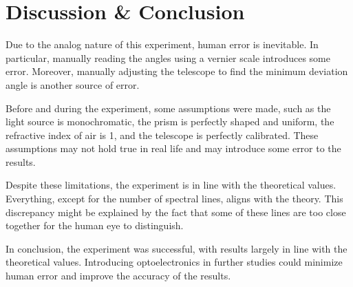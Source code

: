 \documentclass[10pt]{article}
\begin{document}
\section{Discussion \& Conclusion}


Due to the analog nature of this experiment, human error is inevitable. In particular, manually reading the angles using a vernier scale introduces some error. Moreover, manually adjusting the telescope to find the minimum deviation angle is another source of error.

Before and during the experiment, some assumptions were made, such as the light source is monochromatic, the prism is perfectly shaped and uniform, the refractive index of air is 1, and the telescope is perfectly calibrated. These assumptions may not hold true in real life and may introduce some error to the results.

Despite these limitations, the experiment is in line with the theoretical values. Everything, except for the number of spectral lines, aligns with the theory. This discrepancy might be explained by the fact that some of these lines are too close together for the human eye to distinguish.

In conclusion, the experiment was successful, with results largely in line with the theoretical values. Introducing optoelectronics in further studies could minimize human error and improve the accuracy of the results.
\printbibliography
\end{document}
